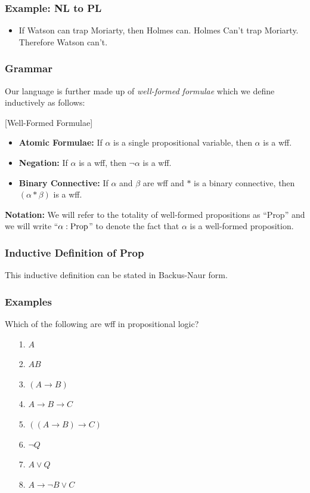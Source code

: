 \documentclass{beamer}
\begin{document}
\begin{frame}
	\frametitle{Example: NL to PL}
	\begin{itemize}
		\item If Watson can trap Moriarty, then Holmes can. Holmes Can't trap Moriarty. Therefore Watson can't.
	\end{itemize}
	
	\vspace{5cm}
	
	
\end{frame}	

\begin{frame}
	\frametitle{Grammar}
	
	Our language is further made up of \emph{well-formed formulae} which we define inductively as follows:	
	
	\vspace{0.5cm}
	\begin{center}[Well-Formed Formulae]
	\begin{itemize}
		\item {\bf Atomic Formulae:} If $\alpha$ is a single propositional variable, then $\alpha$ is a wff.
		\item {\bf Negation:} If $\alpha$ is a wff, then $\lnot\alpha$ is a wff. 
		\item {\bf Binary Connective:} If $\alpha$ and $\beta$ are wff and $*$ is a binary connective, then $(\alpha * \beta)$ is a wff. 		
	\end{itemize}
	\end{center}
	
	{\bf Notation:} We will refer to the totality of well-formed propositions as ``Prop'' and we will write ``$\alpha : \text{Prop}$'' to denote the fact that $\alpha$ is a well-formed proposition. 
	
\end{frame}

\begin{frame}
	\frametitle{Inductive Definition of Prop}

	This inductive definition can be stated in Backus-Naur form.

	\vspace{70mm}

\end{frame}

\begin{frame}
	\frametitle{Examples}
	Which of the following are wff in propositional logic?
	
	\begin{itemize}
		\item[1.] $A$
		\item[2.] $AB$
		\item[3.] $(A \rightarrow B)$
		\item[4.] $A \rightarrow B \rightarrow C$
		\item[5.] $((A \rightarrow B) \rightarrow C)$
		\item[6.] $\lnot Q$
		\item[7.] $A \lor Q$
		\item[8.] $A \rightarrow \lnot B \lor C$		
	\end{itemize}
\end{frame}
\end{document}
